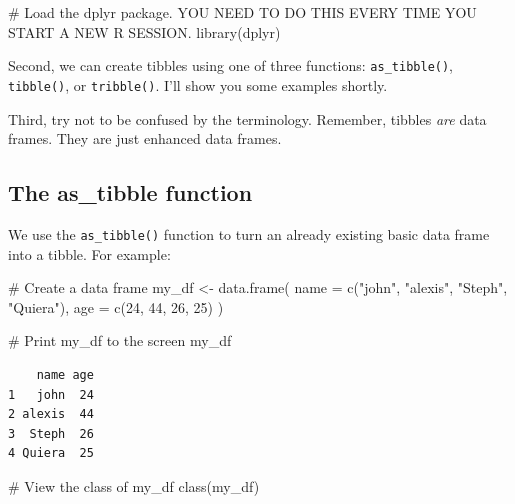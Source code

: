\documentclass[
  letterpaper,
  DIV=11,
  numbers=noendperiod]{scrreprt}
\newenvironment{Shaded}{\begin{snugshade}}{\end{snugshade}}
\newcommand{\AttributeTok}[1]{\textcolor[rgb]{0.40,0.45,0.13}{#1}}
\newcommand{\CommentTok}[1]{\textcolor[rgb]{0.37,0.37,0.37}{#1}}
\newcommand{\DecValTok}[1]{\textcolor[rgb]{0.68,0.00,0.00}{#1}}
\newcommand{\FunctionTok}[1]{\textcolor[rgb]{0.28,0.35,0.67}{#1}}
\newcommand{\NormalTok}[1]{\textcolor[rgb]{0.00,0.23,0.31}{#1}}
\newcommand{\OtherTok}[1]{\textcolor[rgb]{0.00,0.23,0.31}{#1}}
\newcommand{\StringTok}[1]{\textcolor[rgb]{0.13,0.47,0.30}{#1}}
\begin{document}
\begin{Shaded}
\begin{Highlighting}[]
\CommentTok{\# Load the dplyr package. YOU NEED TO DO THIS EVERY TIME YOU START A NEW R SESSION.}
\FunctionTok{library}\NormalTok{(dplyr)}
\end{Highlighting}
\end{Shaded}

Second, we can create tibbles using one of three functions:
\texttt{as\_tibble()}, \texttt{tibble()}, or \texttt{tribble()}. I'll
show you some examples shortly.

Third, try not to be confused by the terminology. Remember, tibbles
\emph{are} data frames. They are just enhanced data frames.

\subsection{The as\_tibble function}\label{the-as_tibble-function}

We use the \texttt{as\_tibble()} function to turn an already existing
basic data frame into a tibble. For example:

\begin{Shaded}
\begin{Highlighting}[]
\CommentTok{\# Create a data frame}
\NormalTok{my\_df }\OtherTok{\textless{}{-}} \FunctionTok{data.frame}\NormalTok{(}
  \AttributeTok{name =} \FunctionTok{c}\NormalTok{(}\StringTok{"john"}\NormalTok{, }\StringTok{"alexis"}\NormalTok{, }\StringTok{"Steph"}\NormalTok{, }\StringTok{"Quiera"}\NormalTok{),}
  \AttributeTok{age  =} \FunctionTok{c}\NormalTok{(}\DecValTok{24}\NormalTok{, }\DecValTok{44}\NormalTok{, }\DecValTok{26}\NormalTok{, }\DecValTok{25}\NormalTok{)}
\NormalTok{)}

\CommentTok{\# Print my\_df to the screen}
\NormalTok{my\_df}
\end{Highlighting}
\end{Shaded}

\begin{verbatim}
    name age
1   john  24
2 alexis  44
3  Steph  26
4 Quiera  25
\end{verbatim}

\begin{Shaded}
\begin{Highlighting}[]
\CommentTok{\# View the class of my\_df}
\FunctionTok{class}\NormalTok{(my\_df)}
\end{Highlighting}
\end{Shaded}
\end{document}
